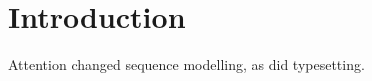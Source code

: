 \section{Introduction}
\label{sec:intro}
Attention \citep{vaswani2017} changed sequence modelling, as \citet{knuth1984} did typesetting.

